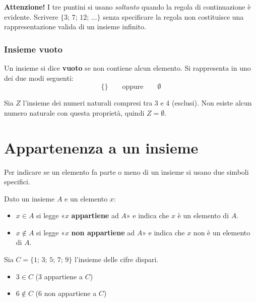 \begin{attenzione}
\textbf{Attenzione!} I tre puntini si usano \emph{soltanto} quando la regola di continuazione è evidente. Scrivere $\{3;\, 7;\, 12;\, \ldots\}$ senza specificare la regola non costituisce una rappresentazione valida di un insieme infinito.
\end{attenzione}

\subsubsection*{Insieme vuoto}

\begin{definizione}
Un insieme si dice \textbf{vuoto} se non contiene alcun elemento. Si rappresenta in uno dei due modi seguenti:
\[
  \{\} \qquad \text{oppure} \qquad \emptyset
\]
\end{definizione}

\begin{esempio}
Sia $Z$ l'insieme dei numeri naturali compresi tra 3 e 4 (esclusi).
Non esiste alcun numero naturale con questa proprietà, quindi $Z = \emptyset$.
\end{esempio}

\section{Appartenenza a un insieme}

Per indicare se un elemento fa parte o meno di un insieme si usano due simboli specifici.

\begin{regola}
Dato un insieme $A$ e un elemento $x$:
\begin{itemize}[leftmargin=1.5em]
  \item $x \in A$ si legge «$x$ \textbf{appartiene} ad $A$» e indica che $x$ è un elemento di $A$.
  \item $x \notin A$ si legge «$x$ \textbf{non appartiene} ad $A$» e indica che $x$ non è un elemento di $A$.
\end{itemize}
\end{regola}

\begin{esempio}
Sia $C = \{1;\, 3;\, 5;\, 7;\, 9\}$ l'insieme delle cifre dispari.

\begin{itemize}[leftmargin=1.5em]
  \item $3 \in C$ \quad (3 appartiene a $C$)
  \item $6 \notin C$ \quad (6 non appartiene a $C$)
\end{itemize}
\end{esempio}

